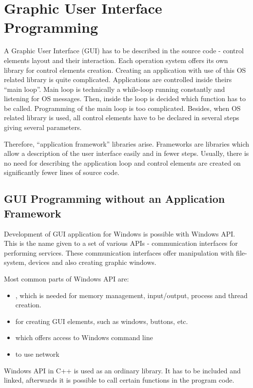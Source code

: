 \chapter{Graphic User Interface Programming}
\vspace{-10mm}

A Graphic User Interface (GUI) has to be described in the source code - control elements layout and their interaction. Each operation system offers its own library for control elements creation. Creating an application with use of this OS related library is quite complicated. Applications are controlled inside theirs ``main loop''. Main loop is technically a while-loop running constantly and listening for OS messages. Then, inside the loop is decided which function has to be called. Programming of the main loop is too complicated. Besides, when OS related library is used, all control elements have to be declared in several steps giving several parameters.

Therefore, ``application framework'' libraries arise. Frameworks are libraries which allow a description of the user interface easily and in fewer steps. Usually, there is no need for describing the application loop and control elements are created on significantly fewer lines of source code.


\section{GUI Programming without an Application Framework}
\label{noqt}

Development of GUI application for Windows is possible with Windows API. This is the name given to a set of various APIs - communication interfaces for performing services. These communication interfaces offer manipulation with file-system, devices and also creating graphic windows.

Most common parts of Windows API are:
\begin{itemize}
\item {}, which is needed for memory management, input/output, process and thread creation.
\item {} for creating GUI elements, such as windows, buttons, etc.
\item {} which offers access to Windows command line
\item {} to use network
\end{itemize}

Windows API in C++ is used as an ordinary library. It has to be included and linked, afterwards it is possible to call certain functions in the program code.


